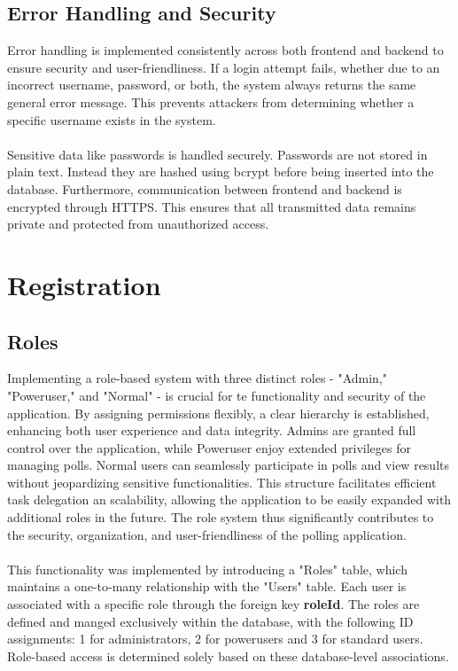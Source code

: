 \documentclass[a4paper,12pt]{report}
\begin{document}
\subsection{Error Handling and Security}
Error handling is implemented consistently across both frontend and backend to ensure security and user-friendliness. If a login attempt fails, whether due to an incorrect username, password, or both, the system always returns the same general error message. This prevents attackers from determining whether a specific username exists in the system.\\\\
Sensitive data like passwords is handled securely. Passwords are not stored in plain text. Instead they are hashed using bcrypt before being inserted into the database. Furthermore, communication between frontend and backend is encrypted through HTTPS. This ensures that all transmitted data remains private and protected from unauthorized access.

\section{Registration}
\subsection{Roles}
Implementing a role-based system with three distinct roles - "Admin," "Poweruser," and "Normal" - is crucial for te functionality and security of the application. By assigning permissions flexibly, a clear hierarchy is established, enhancing both user experience and data integrity. Admins are granted full control over the application, while Poweruser enjoy extended privileges for managing polls. Normal users can seamlessly participate in polls and view results without jeopardizing sensitive functionalities. This structure facilitates efficient task delegation an scalability, allowing the application to be easily expanded with additional roles  in the future. The role system thus significantly contributes to the security, organization, and user-friendliness of the polling application.\\\\


This functionality was implemented by introducing a "Roles" table, which maintains a one-to-many relationship with the "Users" table. Each user is associated with a specific role through the foreign key \textbf{roleId}. The roles are defined and manged exclusively within the database, with the following ID assignments: 1 for administrators, 2 for powerusers and 3 for standard users. Role-based access is determined solely based on these database-level associations.\\\\
\end{document}
